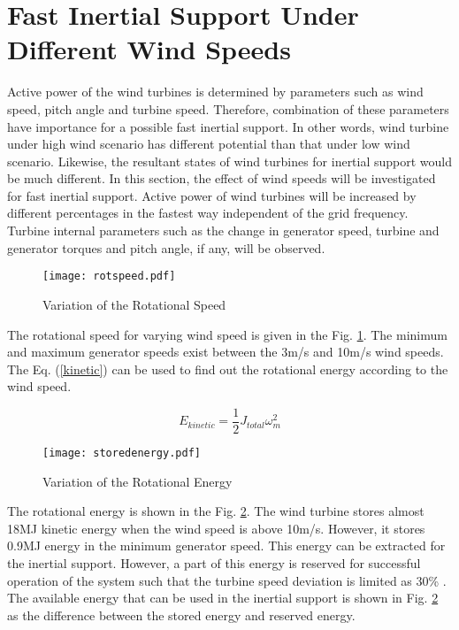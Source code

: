 \section{Fast Inertial Support Under Different Wind Speeds}
Active power of the wind turbines is determined by parameters such as wind speed, pitch angle and turbine speed. Therefore, combination of these parameters have importance for a possible fast inertial support. In other words, wind turbine under high wind scenario has different potential than that under low wind scenario. Likewise, the resultant states of wind turbines for inertial support would be much different. In this section, the effect of wind speeds will be investigated for fast inertial support. Active power of wind turbines will be increased by different percentages in the fastest way independent of the grid frequency. Turbine internal parameters such as the change in generator speed, turbine and generator torques and pitch angle, if any, will be observed. \par
\begin{figure}[h]
	\centering
	\texttt{[image: rotspeed.pdf]}
	\caption{Variation of the Rotational Speed}
	\label{rotspeed}
\end{figure}
The rotational speed for varying wind speed is given in the Fig. \ref{rotspeed}. The minimum and maximum generator speeds exist between the 3m/s and 10m/s wind speeds. The Eq. (\ref{kinetic}) can be used to find out the rotational energy according to the wind speed. \par
\begin{equation}
E_{kinetic}=\frac{1}{2}J_{total}\omega_{m}^{2}
\label{kinetic}
\end{equation}
\begin{figure}[h!]
	\centering
	\texttt{[image: storedenergy.pdf]}
	\caption{Variation of the Rotational Energy}
	\label{rotenergy}
\end{figure}
The rotational energy is shown in the Fig. \ref{rotenergy}. The wind turbine stores almost 18MJ kinetic energy when the wind speed is above 10m/s. However, it stores 0.9MJ energy in the minimum generator speed. This energy can be extracted for the inertial support. However, a part of this energy is reserved for successful operation of the system such that the turbine speed deviation is limited as 30\% \cite{Wu2014}. The available energy that can be used in the inertial support is shown in Fig. \ref{rotenergy} as the difference between the stored energy and reserved energy. \par
